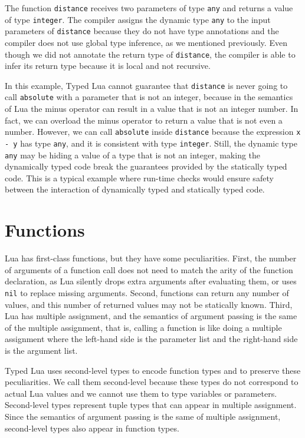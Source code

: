 The function \texttt{distance} receives two parameters of type \texttt{any}
and returns a value of type \texttt{integer}.
The compiler assigns the dynamic type \texttt{any} to the input
parameters of \texttt{distance} because they do not have type annotations
and the compiler does not use global type inference, as we mentioned
previously.
Even though we did not annotate the return type of \texttt{distance},
the compiler is able to infer its return type because it is local
and not recursive.

In this example, Typed Lua cannot guarantee that \texttt{distance} is never
going to call \texttt{absolute} with a parameter that is not an integer,
because in the semantics of Lua the minus operator can result in a
value that is not an integer number.
In fact, we can overload the minus operator to return a value that is
not even a number.
However, we can call \texttt{absolute} inside \texttt{distance}
because the expression \texttt{x - y} has type \texttt{any},
and it is consistent with type \texttt{integer}.
Still, the dynamic type \texttt{any} may be hiding a value of a type
that is not an integer, making the dynamically typed code break the
guarantees provided by the statically typed code.
This is a typical example where run-time checks would ensure safety
between the interaction of dynamically typed and statically typed code.

\section{Functions}
\label{sec:functions}

Lua has first-class functions, but they have some peculiarities.
First, the number of arguments of a function call does
not need to match the arity of the function declaration, as Lua silently
drops extra arguments after evaluating them, or uses \texttt{nil} to
replace missing arguments.
Second, functions can return any number of values,
and this number of returned values may not be statically known.
Third, Lua has multiple assignment, and the semantics
of argument passing is the same of the multiple assignment, that is,
calling a function is like doing a multiple assignment where the
left-hand side is the parameter list and the right-hand side is the
argument list.

Typed Lua uses second-level types to encode function types
and to preserve these peculiarities.
We call them second-level because these types do not correspond
to actual Lua values and we cannot use them to type variables or
parameters.
Second-level types represent tuple types that can appear in multiple assignment.
Since the semantics of argument passing is the same of multiple assignment,
second-level types also appear in function types.

